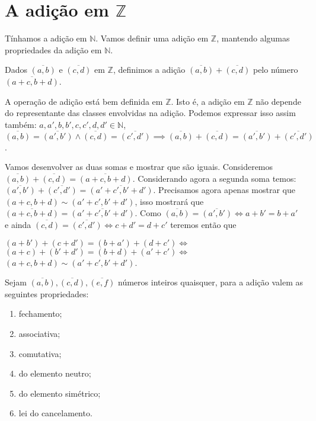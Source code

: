 \documentclass[../main.tex]{subfiles}
\begin{document}
\section{A adição em $\mathbb{Z}$}
Tínhamos a adição em $\mathbb{N}$. Vamos definir uma adição em $\mathbb{Z}$, mantendo algumas propriedades da adição em $\mathbb{N}$.
\begin{defi}\label{int-def-adicao}
    Dados $\overline{(a,b)}$ e $\overline{(c,d)}$ em $\mathbb{Z}$, definimos a adição $\overline{(a,b)} + \overline{(c,d)}$ pelo número $\overline{(a+c, b+d)}$.
\end{defi}
\begin{prop}
    A operação de adição está bem definida em $\mathbb{Z}$. Isto é, a adição em $\mathbb{Z}$ não depende do representante das classes envolvidas na adição. Podemos expressar isso assim também: $a,a',b,b',c,c',d,d' \in \mathbb{N}$, $\overline{(a,b)} = \overline{(a',b')} \land \overline{(c,d)} = \overline{(c',d')}
    \implies \overline{(a,b)} + \overline{(c,d)} = \overline{(a',b')} + \overline{(c',d')} $.
\end{prop}
\begin{dem}
    Vamos desenvolver as duas somas e mostrar que são iguais. Consideremos 
    $\overline{(a,b)} + \overline{(c,d)} = \overline{(a+c,b+d)}$.
    Considerando agora a segunda soma temos: 
    $\overline{(a',b')} + \overline{(c',d')} = \overline{(a'+c',b'+d')}$.
    Precisamos agora apenas mostrar que $(a+c,b+d) \sim (a'+c',b'+d')$, isso mostrará que 
    $\overline{(a+c,b+d)} = \overline{(a'+c',b'+d')}$. 
    Como $\overline{(a,b)} = \overline{(a',b')} \iff a+b' = b+a'$ e ainda
     $\overline{(c,d)} = \overline{(c',d')} \iff c+d' = d+c'$ teremos então que 
     \begin{center}
         $(a+b')+(c+d') = (b+a')+(d+c') \iff $ \\
         $(a+c) + (b'+d') = (b+d) + (a'+c') \iff $ \\
         $(a+c,b+d) \sim (a'+c',b'+d')$.
     \end{center}
\end{dem}

\begin{prop}{Sejam $\overline{(a,b)}, \overline{(c,d)}, \overline{(e,f)}$ números inteiros quaisquer, para a adição valem as seguintes propriedades:}
    \begin{enumerate}[label=(\roman*)]
        \item fechamento;
        \item associativa;
        \item comutativa;
        \item do elemento neutro; 
        \item do elemento simétrico;
        \item lei do cancelamento.
    \end{enumerate}
\end{prop}
\end{document}
